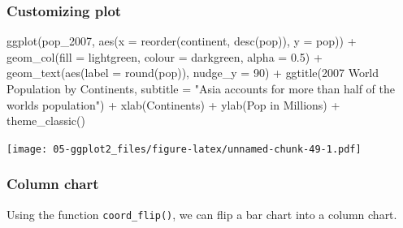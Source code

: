 \documentclass[
]{book}
\newenvironment{Shaded}{\begin{snugshade}}{\end{snugshade}}
\newcommand{\AttributeTok}[1]{\textcolor[rgb]{0.77,0.63,0.00}{#1}}
\newcommand{\DecValTok}[1]{\textcolor[rgb]{0.00,0.00,0.81}{#1}}
\newcommand{\FloatTok}[1]{\textcolor[rgb]{0.00,0.00,0.81}{#1}}
\newcommand{\FunctionTok}[1]{\textcolor[rgb]{0.00,0.00,0.00}{#1}}
\newcommand{\NormalTok}[1]{#1}
\newcommand{\SpecialCharTok}[1]{\textcolor[rgb]{0.00,0.00,0.00}{#1}}
\newcommand{\StringTok}[1]{\textcolor[rgb]{0.31,0.60,0.02}{#1}}
\begin{document}
\hypertarget{customizing-plot}{%
\subsubsection{Customizing plot}\label{customizing-plot}}

\begin{Shaded}
\begin{Highlighting}[]
\FunctionTok{ggplot}\NormalTok{(pop\_2007, }\FunctionTok{aes}\NormalTok{(}\AttributeTok{x =} \FunctionTok{reorder}\NormalTok{(continent, }\FunctionTok{desc}\NormalTok{(pop)), }\AttributeTok{y =}\NormalTok{ pop)) }\SpecialCharTok{+} 
   \FunctionTok{geom\_col}\NormalTok{(}\AttributeTok{fill =} \StringTok{\textquotesingle{}lightgreen\textquotesingle{}}\NormalTok{, }\AttributeTok{colour =} \StringTok{\textquotesingle{}darkgreen\textquotesingle{}}\NormalTok{, }\AttributeTok{alpha =} \FloatTok{0.5}\NormalTok{) }\SpecialCharTok{+}
   \FunctionTok{geom\_text}\NormalTok{(}\FunctionTok{aes}\NormalTok{(}\AttributeTok{label =} \FunctionTok{round}\NormalTok{(pop)), }\AttributeTok{nudge\_y =} \DecValTok{90}\NormalTok{) }\SpecialCharTok{+} 
   \FunctionTok{ggtitle}\NormalTok{(}\StringTok{\textquotesingle{}2007 World Population by Continents\textquotesingle{}}\NormalTok{, }
           \AttributeTok{subtitle =} \StringTok{"Asia accounts for more than half of the world\textquotesingle{}s population"}\NormalTok{) }\SpecialCharTok{+}
   \FunctionTok{xlab}\NormalTok{(}\StringTok{\textquotesingle{}Continents\textquotesingle{}}\NormalTok{) }\SpecialCharTok{+}
   \FunctionTok{ylab}\NormalTok{(}\StringTok{\textquotesingle{}Pop in Millions\textquotesingle{}}\NormalTok{) }\SpecialCharTok{+}
   \FunctionTok{theme\_classic}\NormalTok{()}
\end{Highlighting}
\end{Shaded}

\texttt{[image: 05-ggplot2\_files/figure-latex/unnamed-chunk-49-1.pdf]}

\hypertarget{column-chart}{%
\subsubsection{Column chart}\label{column-chart}}

Using the function \texttt{coord\_flip()}, we can flip a bar chart into a column chart.
\end{document}
